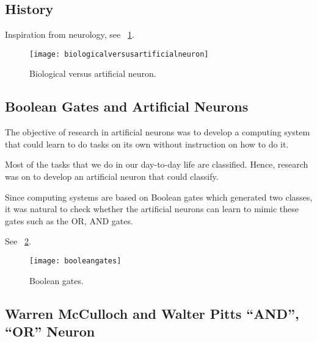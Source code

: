 	\subsection{History}
Inspiration from neurology, see \figurename~\ref{fig:biologicalversusartificialneuron}.
 	\begin{figure}[h]
		\centering
		\texttt{[image: biologicalversusartificialneuron]}
		\caption[Biological versus artificial neuron]{Biological versus artificial neuron.}
		\label{fig:biologicalversusartificialneuron}
	\end{figure}

	\subsection{Boolean Gates and Artificial Neurons}

	\begin{bulletedlist}
		\item The objective of research in artificial neurons was to develop a computing system that could learn to do tasks on its own without instruction on how to do it.
		\item Most of the tasks that we do in our day-to-day life are classified. Hence, research was on to develop an artificial neuron that could classify.
		\item Since computing systems are based on Boolean gates which generated two classes, it was natural to check whether the artificial neurons can learn to mimic these gates such as the OR, AND gates.
	\end{bulletedlist}
See \figurename~\ref{fig:booleangates}.
 	\begin{figure}[h]
		\centering
		\texttt{[image: booleangates]}
		\caption[Boolean gates]{Boolean gates.}
		\label{fig:booleangates}
	\end{figure}

	\subsection{Warren McCulloch and Walter Pitts ``AND'', ``OR'' Neuron}

